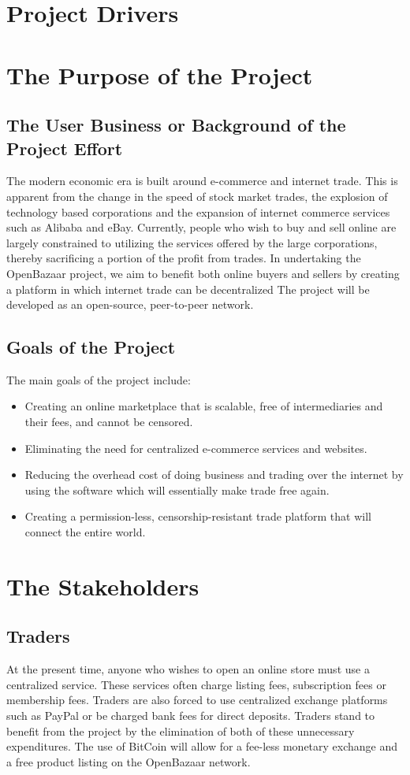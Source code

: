 \documentclass{article}
\begin{document}
\section*{Project Drivers}
\section{The Purpose of the Project}
\subsection{The User Business or Background of the Project Effort}
The modern economic era is built around e-commerce and internet trade. This is apparent from the change in the speed of stock market trades, the explosion of technology based corporations and the expansion of internet commerce services such as Alibaba and eBay.
Currently, people who wish to buy and sell online are largely constrained to utilizing the services offered by the large corporations, thereby sacrificing a portion of the profit from trades. In undertaking the OpenBazaar project, we aim to benefit both online buyers and sellers by creating a platform in which internet trade can be decentralized
The project will be developed as an open-source, peer-to-peer network. 
\subsection{Goals of the Project}
The main goals of the project include:
\begin{itemize}
\item
Creating an online marketplace that is scalable, free of intermediaries and their fees, and cannot be censored.
\item
Eliminating the need for centralized e-commerce services and websites.
\item
Reducing the overhead cost of doing business and trading over the internet by using the software which will essentially make trade free again.
\item
Creating a permission-less, censorship-resistant trade platform that will connect the entire world.
\end{itemize}
\section{The Stakeholders}
\subsection{Traders}
At the present time, anyone who wishes to open an online store must use a centralized service. These services often charge listing fees, subscription fees or membership fees. Traders are also forced to use centralized exchange platforms such as PayPal or be charged bank fees for direct deposits. Traders stand to benefit from the project by the elimination of both of these unnecessary expenditures. The use of BitCoin will allow for a fee-less monetary exchange and a free product listing on the OpenBazaar network.
\end{document}
